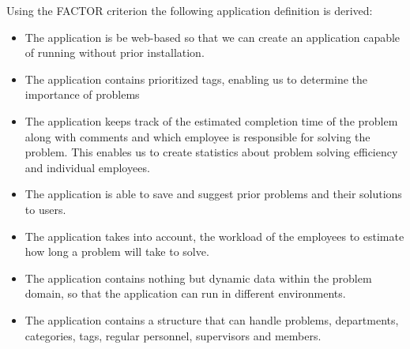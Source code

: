 Using the FACTOR criterion the following application definition is derived:
\begin{itemize}
\item The application is be web-based so that we can create an application capable of running without prior installation.
\item The application contains prioritized tags, enabling us to determine the importance of problems
\item The application keeps track of the estimated completion time of the problem along with comments and which employee is responsible for solving the problem.
This enables us to create statistics about problem solving efficiency and individual employees.
\item The application is able to save and suggest prior problems and their solutions to users.
\item The application takes into account, the workload of the employees to estimate how long a problem will take to solve.
\item The application contains nothing but dynamic data within the problem domain, so that the application can run in different environments.
\item The application contains a structure that can handle problems, departments, categories, tags, regular personnel, supervisors and \astaff[] members.
\end{itemize}

\begin{comment}
Using these FACTOR criteria, we arrive at the following application definition:
\begin{itemize}
\item The application is be web-based so that we can create an application capable of running without prior installation.
\item The application should contain prioritized tags, enabling us to determine the importance of problems
\item The application should keep track of the estimated completion time of the problem along with comments and what employee is responsible for the problem. This will enable us to create statistic about problem solving efficiency and individual employees.
\item The application should be able to save and suggest prior problems and their solutions to users.
\item The application should take into account, the workload of the employees to estimate how long a problem will take to solve.
\item The application should should contain nothing but dynamic data within the problem domain, so that the application can run in different environments.
\item The application should contain a structure that can handle problems, departments, categories, tags, employees, supervisors and ordinary users.
\end{itemize}
\end{comment}


